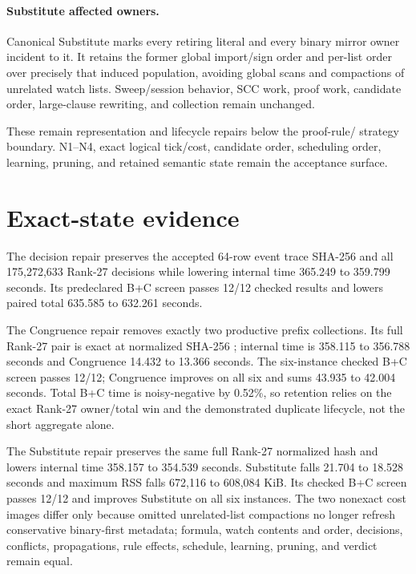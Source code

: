 \documentclass[11pt]{article}
\newcommand{\code}[1]{\texttt{\detokenize{#1}}}
\begin{document}
\paragraph{Substitute affected owners.}
Canonical Substitute marks every retiring literal and every binary mirror
owner incident to it.  It retains the former global import/sign order and
per-list order over precisely that induced population, avoiding global scans
and compactions of unrelated watch lists.  Sweep/session behavior, SCC work,
proof work, candidate order, large-clause rewriting, and collection remain
unchanged.

These remain representation and lifecycle repairs below the proof-rule/
strategy boundary.  N1--N4, exact logical tick/cost, candidate order,
scheduling order, learning, pruning, and retained semantic state remain the
acceptance surface.

\section{Exact-state evidence}
The decision repair preserves the accepted 64-row event trace SHA-256
\code{7a6216bb...7cc1} and all 175,272,633 Rank-27 decisions while lowering
internal time 365.249 to 359.799 seconds.  Its predeclared B+C screen passes
12/12 checked results and lowers paired total 635.585 to 632.261 seconds.

The Congruence repair removes exactly two productive prefix collections.  Its
full Rank-27 pair is exact at normalized SHA-256 \code{10372d94...f1ffd0};
internal time is 358.115 to 356.788 seconds and Congruence 14.432 to 13.366
seconds.  The six-instance checked B+C screen passes 12/12; Congruence improves
on all six and sums 43.935 to 42.004 seconds.  Total B+C time is noisy-negative
by 0.52\%, so retention relies on the exact Rank-27 owner/total win and the
demonstrated duplicate lifecycle, not the short aggregate alone.

The Substitute repair preserves the same full Rank-27 normalized hash and
lowers internal time 358.157 to 354.539 seconds.  Substitute falls 21.704 to
18.528 seconds and maximum RSS falls 672,116 to 608,084 KiB.  Its checked B+C
screen passes 12/12 and improves Substitute on all six instances.  The two
nonexact cost images differ only because omitted unrelated-list compactions no
longer refresh conservative binary-first metadata; formula, watch contents and
order, decisions, conflicts, propagations, rule effects, schedule, learning,
pruning, and verdict remain equal.
\end{document}
